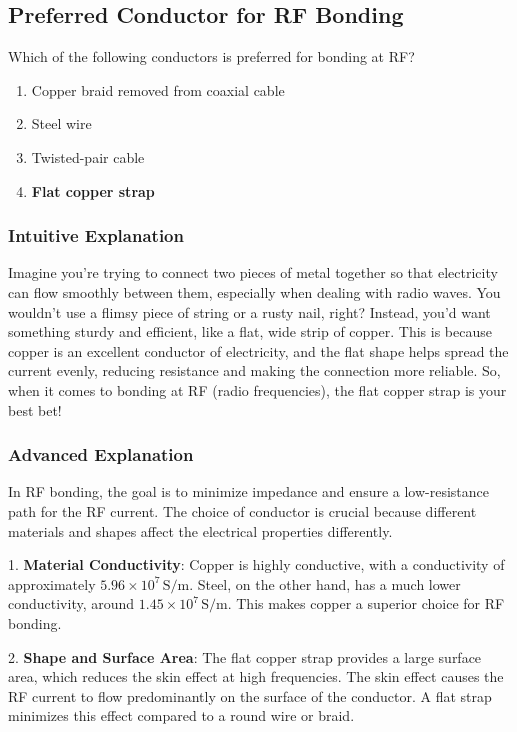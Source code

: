 \subsection{Preferred Conductor for RF Bonding}
\label{T4A08}

\begin{tcolorbox}[colback=gray!10!white,colframe=black!75!black,title=T4A08]
Which of the following conductors is preferred for bonding at RF?
\begin{enumerate}[label=\Alph*)]
    \item Copper braid removed from coaxial cable
    \item Steel wire
    \item Twisted-pair cable
    \item \textbf{Flat copper strap}
\end{enumerate}
\end{tcolorbox}

\subsubsection{Intuitive Explanation}
Imagine you're trying to connect two pieces of metal together so that electricity can flow smoothly between them, especially when dealing with radio waves. You wouldn't use a flimsy piece of string or a rusty nail, right? Instead, you'd want something sturdy and efficient, like a flat, wide strip of copper. This is because copper is an excellent conductor of electricity, and the flat shape helps spread the current evenly, reducing resistance and making the connection more reliable. So, when it comes to bonding at RF (radio frequencies), the flat copper strap is your best bet!

\subsubsection{Advanced Explanation}
In RF bonding, the goal is to minimize impedance and ensure a low-resistance path for the RF current. The choice of conductor is crucial because different materials and shapes affect the electrical properties differently.

1. \textbf{Material Conductivity}: Copper is highly conductive, with a conductivity of approximately \(5.96 \times 10^7 \, \text{S/m}\). Steel, on the other hand, has a much lower conductivity, around \(1.45 \times 10^7 \, \text{S/m}\). This makes copper a superior choice for RF bonding.

2. \textbf{Shape and Surface Area}: The flat copper strap provides a large surface area, which reduces the skin effect at high frequencies. The skin effect causes the RF current to flow predominantly on the surface of the conductor. A flat strap minimizes this effect compared to a round wire or braid.

